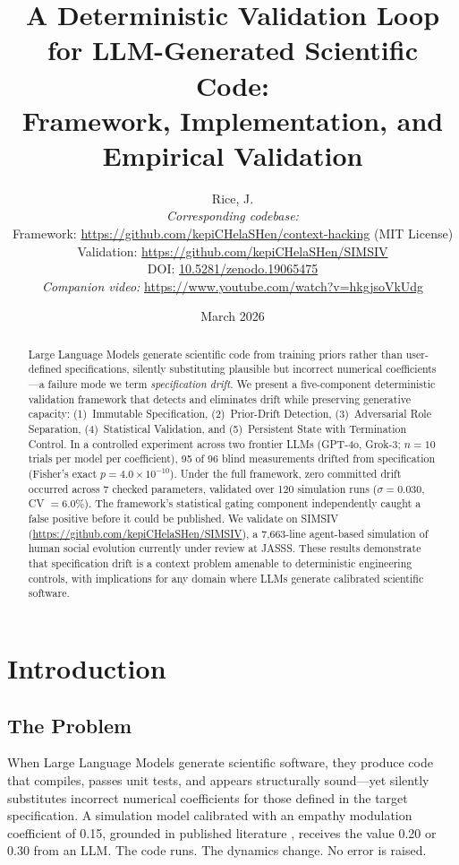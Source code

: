\documentclass[11pt,a4paper]{article}
\title{A Deterministic Validation Loop for LLM-Generated Scientific Code:\\
Framework, Implementation, and Empirical Validation}
\author{Rice, J.\\[6pt]
\textit{Corresponding codebase:}\\
Framework: \url{https://github.com/kepiCHelaSHen/context-hacking} (MIT License)\\
Validation: \url{https://github.com/kepiCHelaSHen/SIMSIV}\\
DOI: \href{https://doi.org/10.5281/zenodo.19065475}{10.5281/zenodo.19065475}\\[6pt]
\textit{Companion video:} \url{https://www.youtube.com/watch?v=hkgjsoVkUdg}
}
\date{March 2026}
\begin{document}
\maketitle

\begin{abstract}
Large Language Models generate scientific code from training priors rather than user-defined specifications, silently substituting plausible but incorrect numerical coefficients---a failure mode we term \textit{specification drift}. We present a five-component deterministic validation framework that detects and eliminates drift while preserving generative capacity: (1)~Immutable Specification, (2)~Prior-Drift Detection, (3)~Adversarial Role Separation, (4)~Statistical Validation, and (5)~Persistent State with Termination Control. In a controlled experiment across two frontier LLMs (GPT-4o, Grok-3; $n = 10$ trials per model per coefficient), 95 of 96 blind measurements drifted from specification (Fisher's exact $p = 4.0 \times 10^{-10}$). Under the full framework, zero committed drift occurred across 7 checked parameters, validated over 120 simulation runs ($\sigma = 0.030$, CV $= 6.0\%$). The framework's statistical gating component independently caught a false positive before it could be published. We validate on SIMSIV (\url{https://github.com/kepiCHelaSHen/SIMSIV}), a 7,663-line agent-based simulation of human social evolution currently under review at JASSS. These results demonstrate that specification drift is a context problem amenable to deterministic engineering controls, with implications for any domain where LLMs generate calibrated scientific software.
\end{abstract}

\section{Introduction}

\subsection{The Problem}

When Large Language Models generate scientific software, they produce code that compiles, passes unit tests, and appears structurally sound---yet silently substitutes incorrect numerical coefficients for those defined in the target specification. A simulation model calibrated with an empathy modulation coefficient of 0.15, grounded in published literature \citep{dewaal2008}, receives the value 0.20 or 0.30 from an LLM. The code runs. The dynamics change. No error is raised.
\end{document}
